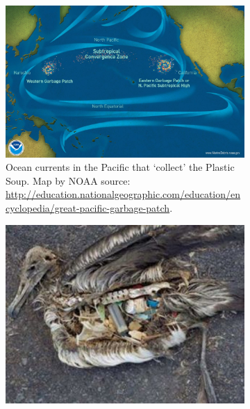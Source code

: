 \begin{figure}%
  \centering
   \begin{minipage}{\widefigwidth}
 	\begin{center}
     \begin{subfigure}[t]{.65\textwidth}
      \ifx\showfig\undefined
       \includegraphics[keepaspectratio=true,width=\textwidth]{images/garbage-patch.jpg} \fi
      \caption{Ocean currents in the Pacific that `collect' the Plastic Soup. Map by NOAA source: \url{http://education.nationalgeographic.com/education/encyclopedia/great-pacific-garbage-patch}.}
      \label{fig:plastic-where}
     \end{subfigure}
    \end{center}
   \begin{subfigure}[t]{.48\textwidth}
    \ifx\showfig\undefined
	 \includegraphics[keepaspectratio=true,width=\textwidth]{images/Bird_with_plastic_stomach.jpg} \fi

\end{subfigure}
\end{minipage}
\end{figure}
